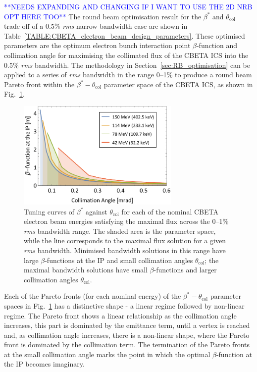 \documentclass[../main.tex]{subfiles}
\begin{document}
\textcolor{blue}{**NEEDS EXPANDING AND CHANGING IF I WANT TO USE THE 2D NRB OPT HERE TOO**}
The round beam optimisation result for the $\beta^{*}$ and $\theta_{\mathrm{col}}$ trade-off of a 0.5\% \textit{rms} narrow bandwidth case are shown in Table~\ref{TABLE:CBETA_electron_beam_design_parameters}. These optimised parameters are the optimum electron bunch interaction point $\beta$-function and collimation angle for maximising the collimated flux of the CBETA ICS into the 0.5\% \textit{rms} bandwidth. The methodology in Section~\ref{sec:RB_optimisation} can be applied to a series of \textit{rms} bandwidth in the range 0--1\% to produce a round beam Pareto front within the $\beta^{*}-\theta_{\mathrm{col}}$ parameter space of the CBETA ICS, as shown in Fig.~\ref{fig:CBETA_beta_theta_parameter_space}.
\begin{figure}[!h]
\centering
\includegraphics[width=0.7\textwidth]{Figures/CBETA_Inverse_Compton_Source_Design/CBETABetaTheta.pdf}
\caption{Tuning curves of $\beta^{*}$ against $\theta_{\mathrm{col}}$ for each of the nominal CBETA electron beam energies satisfying the maximal flux across the 0--1\% \textit{rms} bandwidth range. The shaded area is the parameter space, while the line corresponds to the maximal flux solution for a given \textit{rms} bandwidth. Minimised bandwidth solutions in this range have large $\beta$-functions at the IP and small collimation angles $\theta_{\mathrm{col}}$; the maximal bandwidth solutions have small $\beta$-functions and larger collimation angles $\theta_{\mathrm{col}}$.}
\label{fig:CBETA_beta_theta_parameter_space}
\end{figure}

Each of the Pareto fronts (for each nominal energy) of the $\beta^{*}-\theta_{\mathrm{col}}$ parameter spaces in Fig.~\ref{fig:CBETA_beta_theta_parameter_space} has a distinctive shape - a linear regime followed by non-linear regime. The Pareto front shows a linear relationship as the collimation angle increases, this part is dominated by the emittance term, until a vertex is reached and, as collimation angle increases, there is a non-linear shape, where the Pareto front is dominated by the collimation term. The termination of the Pareto fronts at the small collimation angle marks the point in which the optimal $\beta$-function at the IP becomes imaginary.
\end{document}
